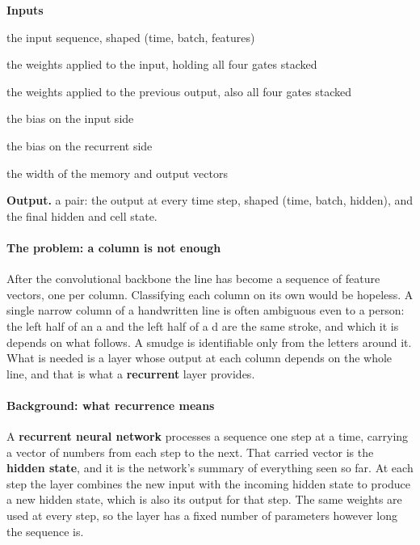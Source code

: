 \noindent\textbf{Inputs}
\begin{description}[leftmargin=2.2em,style=nextline,font=\normalfont\ttfamily]\setlength\itemsep{1pt}
  \item[{x}] \normalfont the input sequence, shaped (time, batch, features)
  \item[{weightIh}] \normalfont the weights applied to the input, holding all four gates stacked
  \item[{weightHh}] \normalfont the weights applied to the previous output, also all four gates stacked
  \item[{biasIh}] \normalfont the bias on the input side
  \item[{biasHh}] \normalfont the bias on the recurrent side
  \item[{hiddenSize}] \normalfont the width of the memory and output vectors
\end{description}

\noindent\textbf{Output.} a pair: the output at every time step, shaped (time, batch, hidden), and the final hidden and cell state.


\paragraph{The problem: a column is not enough}
After the convolutional backbone the line has become a sequence of feature vectors, one per column. Classifying each column on its own would be hopeless. A single narrow column of a handwritten line is often ambiguous even to a person: the left half of an a and the left half of a d are the same stroke, and which it is depends on what follows. A smudge is identifiable only from the letters around it. What is needed is a layer whose output at each column depends on the whole line, and that is what a \textbf{recurrent} layer provides.


\paragraph{Background: what recurrence means}
A \textbf{recurrent neural network} processes a sequence one step at a time, carrying a vector of numbers from each step to the next. That carried vector is the \textbf{hidden state}, and it is the network's summary of everything seen so far. At each step the layer combines the new input with the incoming hidden state to produce a new hidden state, which is also its output for that step. The same weights are used at every step, so the layer has a fixed number of parameters however long the sequence is.


